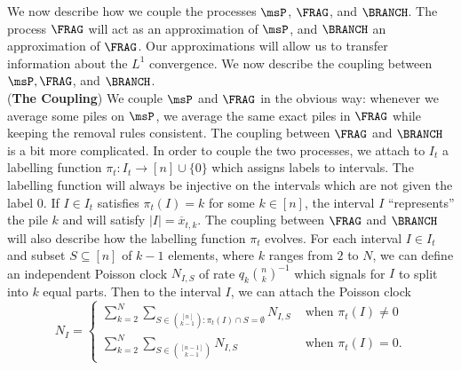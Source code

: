 \documentclass[12pt]{article}
\begin{document}
We now describe how we couple the processes $\msP$, $\FRAG$, and $\BRANCH$. The process $\FRAG$ will act as an approximation of $\msP$, and $\BRANCH$ an approximation of $\FRAG$. Our approximations will allow us to transfer information about the $L^1$ convergence. We now describe the coupling between $\msP, \FRAG$, and $\BRANCH$. \\


	(\textbf{The Coupling}) We couple $\msP$ and $\FRAG$ in the obvious way: whenever we average some piles on $\msP$, we average the same exact piles in $\FRAG$ while keeping the removal rules consistent. The coupling between $\FRAG$ and $\BRANCH$ is a bit more complicated. In order to couple the two processes, we attach to $I_t$ a labelling function $\pi_t : I_t \to [n] \cup \{0\}$ which assigns labels to intervals. The labelling function will always be injective on the intervals which are not given the label $0$. If $I \in I_t$ satisfies $\pi_t(I) = k$ for some $k \in [n]$, the interval $I$ ``represents'' the pile $k$ and will satisfy $|I| = \overline{x}_{t, k}$. The coupling between $\FRAG$ and $\BRANCH$ will also describe how the labelling function $\pi_t$ evolves. For each interval $I \in I_t$ and subset $S \subseteq [n]$ of $k-1$ elements, where $k$ ranges from $2$ to $N$, we can define an independent Poisson clock $N_{I, S}$ of rate $q_k \binom{n}{k}^{-1}$ which signals for $I$ to split into $k$ equal parts. Then to the interval $I$, we can attach the Poisson clock
	\[
		N_I = \begin{cases}
			\sum_{k = 2}^N \sum_{S \in \binom{[n]}{k-1} : \pi_t(I) \cap S = \emptyset} N_{I, S} & \text{ when $\pi_t(I) \neq 0$} \\
			\sum_{k = 2}^N \sum_{S \in \binom{[n-1]}{k-1}} N_{I, S} & \text{ when $\pi_t(I) = 0$}.
		\end{cases}
	\]
\end{document}
